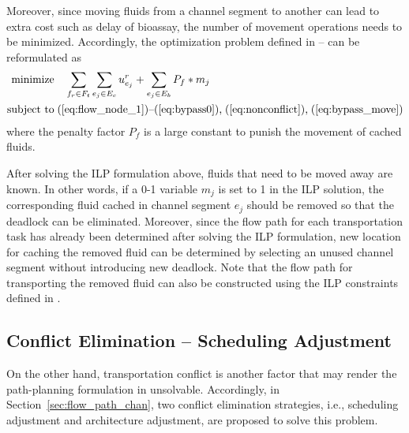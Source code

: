 Moreover, since moving fluids from a channel segment to another can lead to extra cost such as delay of bioassay, the number of movement operations needs to be minimized. Accordingly, the optimization problem defined in \text{(\ref{eq:ILP_flow_paths})}--\text{(\ref{eq:ILP_flow_paths_last})} can be reformulated as
\begin{align}\label{eq:ILP_flow_paths_deadlock}
\text{minimize} & \quad \sum_{f_r\in F_t} \sum_{e_j\in E_c} u^r_{e_j}
+ \sum_{e_j \in E_b} P_f * m_j \\\label{eq:ILP_flow_paths_deadlock_last}
\text{subject to} & \;
\text{(\ref{eq:flow_node_1})--(\ref{eq:bypass0}),\;(\ref{eq:nonconflict}),\;(\ref{eq:bypass_move})}
\end{align}
where the penalty factor $P_f$ is a large constant to punish the movement of cached fluids.

After solving the ILP formulation above, fluids that need to be moved away are known. In other words, if a 0-1 variable $m_j$ is set to 1 in the ILP solution, the corresponding fluid cached in channel segment $e_j$ should be removed so that the deadlock can be eliminated. Moreover, since the flow path for each transportation task has already been determined after solving the ILP formulation, new location for caching the removed fluid can be determined by selecting an unused channel segment without introducing new deadlock. Note that the flow path for transporting the removed fluid can also be constructed using the ILP constraints defined in \text{(\ref{eq:flow_node_1})--(\ref{eq:nonconflict})}.



\subsection{Conflict Elimination -- Scheduling Adjustment}\label{sec:ILP_flow_paths}

On the other hand, transportation conflict is another factor that may render the path-planning formulation in \text{(\ref{eq:ILP_flow_paths})--(\ref{eq:ILP_flow_paths_last})} unsolvable. Accordingly, in Section~\ref{sec:flow_path_chan}, two conflict elimination strategies, i.e., scheduling adjustment and architecture adjustment, are proposed to solve this problem.


